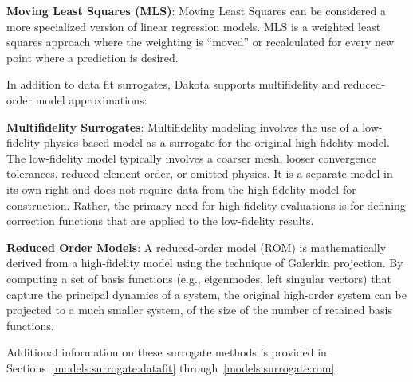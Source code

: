 \textbf{Moving Least Squares (MLS)}: Moving Least Squares can be 
considered a more specialized version of linear regression models.
MLS is a weighted least squares approach where the weighting is 
``moved'' or recalculated for every new point where 
a prediction is desired.~\cite{Nea04} 


In addition to data fit surrogates, Dakota supports multifidelity 
and reduced-order model approximations:

\textbf{Multifidelity Surrogates}: Multifidelity modeling involves the
use of a low-fidelity physics-based model as a surrogate for the
original high-fidelity model.  The low-fidelity model typically
involves a coarser mesh, looser convergence tolerances, reduced
element order, or omitted physics.  It is a separate model in its own
right and does not require data from the high-fidelity model for
construction.  Rather, the primary need for high-fidelity evaluations
is for defining correction functions that are applied to the
low-fidelity results.

\textbf{Reduced Order Models}: A reduced-order model (ROM) is
mathematically derived from a high-fidelity model using the technique
of Galerkin projection.  By computing a set of basis functions (e.g.,
eigenmodes, left singular vectors) that capture the principal dynamics
of a system, the original high-order system can be projected to a much
smaller system, of the size of the number of retained basis functions.

Additional information on these surrogate methods is provided in
Sections~\ref{models:surrogate:datafit} through~\ref{models:surrogate:rom}.


